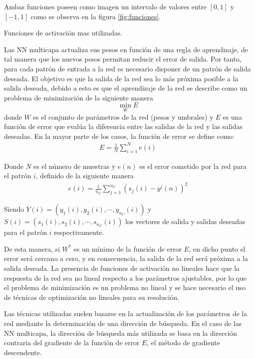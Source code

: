 Ambas funciones poseen como imagen un intervalo de valores entre $[0, 1]$ y $[-1, 1]$ como se observa en la figura \ref{fig:funciones}.%

\begin{imagen}
	\scalebox{1.0}{}
	\caption{Funciones de activación mas utilizadas.}
	\label{fig:funciones}
\end{imagen}

Las NN multicapa actualiza sus pesos en función de una regla de aprendizaje, de tal manera que los nuevos pesos permitan reducir el error de salida. Por tanto, para cada patrón de entrada a la red es necesario disponer de un patrón de salida deseada. El objetivo es que la salida de la red sea lo más próxima posible a la salida deseada, debido a esto es que el aprendizaje de la red se describe como un problema de minimización de la siguiente manera $$ \min_{W} E $$ donde $W$ es el conjunto de parámetros de la red (pesos y umbrales) y $E$ es una función de error que evalúa la diferencia entre las salidas de la red y las salidas deseadas. En la mayor parte de los casos, la función de error se define como:
\begin{eqnarray}
	E = \frac{1}{N}\sum^{N}_{i = 1} e(i)
\end{eqnarray}

Donde $N$ es el número de muestras y $e(n)$ es el error cometido por la red para el patrón $i$, definido de la siguiente manera
\begin{eqnarray}
	e(i) = \frac{1}{n_{C}}\sum^{n_{C}}_{j = 1} (s_{j}(i) - y^{j}(n))^2\label{eq:error_patron}
\end{eqnarray}

Siendo $Y(i) = (y_{1}(i), y_{2}(i), \cdots, y_{n_{C}}(i))$ y $S(i) = (s_{1}(i), s_{2}(i), \cdots, s_{n_{C}}(i))$ los vectores de salida y salidas deseadas para el patrón $i$ respectivamente.

De esta manera, si $W^{*}$ es un mínimo de la función de error $E$, en dicho punto el error será cercano a cero, y en consecuencia, la salida de la red será próxima a la salida deseada. La presencia de funciones de activación no lineales hace que la respuesta de la red sea no lineal respecto a los parámetros ajustables, por lo que el problema de minimización es un problema no lineal y se hace necesario el uso de técnicas de optimización no lineales para su resolución.

Las técnicas utilizadas suelen basarse en la actualización de los parámetros de la red mediante la determinación de una dirección de búsqueda. En el caso de las NN multicapa, la dirección de búsqueda más utilizada se basa en la dirección contraria del gradiente de la función de error $E$, el método de gradiente descendente.


